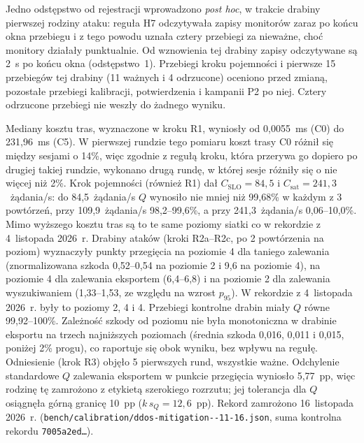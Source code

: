 \documentclass[a4paper,12pt]{article}
\begin{document}
Jedno odstępstwo od rejestracji wprowadzono \textit{post hoc}, w trakcie drabiny pierwszej rodziny ataku: reguła H7 odczytywała zapisy monitorów zaraz po końcu okna przebiegu i z tego powodu uznała cztery przebiegi za nieważne, choć monitory działały punktualnie. Od wznowienia tej drabiny zapisy odczytywane są 2~s po końcu okna (odstępstwo~1). Przebiegi kroku pojemności i pierwsze 15 przebiegów tej drabiny (11 ważnych i 4 odrzucone) oceniono przed zmianą, pozostałe przebiegi kalibracji, potwierdzenia i kampanii P2 po niej. Cztery odrzucone przebiegi nie weszły do żadnego wyniku.

Mediany kosztu tras, wyznaczone w kroku R1, wyniosły od 0,0055~ms (C0) do 231,96~ms (C5). W pierwszej rundzie tego pomiaru koszt trasy C0 różnił się między sesjami o 14\%, więc zgodnie z regułą kroku, która przerywa go dopiero po drugiej takiej rundzie, wykonano drugą rundę, w której sesje różniły się o nie więcej niż 2\%. Krok pojemności (również R1) dał $C_{\mathrm{SLO}} = 84{,}5$ i $C_{\mathrm{sat}} = 241{,}3$~żądania/s: do 84,5~żądania/s $Q$ wynosiło nie mniej niż 99,68\% w każdym z 3 powtórzeń, przy 109,9~żądania/s 98,2--99,6\%, a przy 241,3~żądania/s 0,06--10,0\%. Mimo wyższego kosztu tras są to te same poziomy siatki co w rekordzie z 4~listopada 2026~r. Drabiny ataków (kroki R2a--R2c, po 2 powtórzenia na poziom) wyznaczyły punkty przegięcia na poziomie 4 dla taniego zalewania (znormalizowana szkoda 0,52--0,54 na poziomie 2 i 9,6 na poziomie 4), na poziomie 4 dla zalewania eksportem (6,4--6,8) i na poziomie 2 dla zalewania wyszukiwaniem (1,33--1,53, ze względu na wzrost $p_{95}$). W rekordzie z 4~listopada 2026~r. były to poziomy 2, 4 i 4. Przebiegi kontrolne drabin miały $Q$ równe 99,92--100\%. Zależność szkody od poziomu nie była monotoniczna w drabinie eksportu na trzech najniższych poziomach (średnia szkoda 0,016, 0,011 i 0,015, poniżej 2\% progu), co raportuje się obok wyniku, bez wpływu na regułę. Odniesienie (krok R3) objęło 5 pierwszych rund, wszystkie ważne. Odchylenie standardowe $Q$ zalewania eksportem w punkcie przegięcia wyniosło 5,77~pp, więc rodzinę tę zamrożono z etykietą szerokiego rozrzutu; jej tolerancja dla $Q$ osiągnęła górną granicę 10~pp ($k\,s_Q = 12{,}6$~pp). Rekord zamrożono 16~listopada 2026~r. (\texttt{bench/\allowbreak calibration/\allowbreak ddos-mitigation--11-16.json}, suma kontrolna rekordu \texttt{7005a2ed\ldots}).
\end{document}
